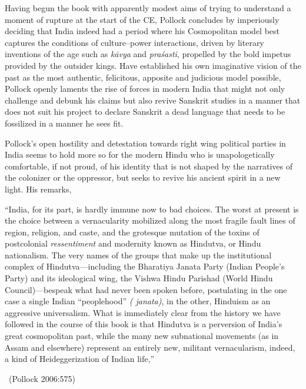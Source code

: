 Having begun the book with apparently modest aims of trying to understand a moment of rupture at the start of the CE, Pollock concludes by imperiously deciding that India indeed had a period where his Cosmopolitan model best captures the conditions of culture–power interactions, driven by literary inventions of the age such as \textit{kāvya} and \textit{praśasti}, propelled by the bold impetus provided by the outsider kings. Have established his own imaginative vision of the past as the most authentic, felicitous, apposite and judicious model possible, Pollock openly laments the rise of forces in modern India that might not only challenge and debunk his claims but also revive Sanskrit studies in a manner that does not suit his project to declare Sanskrit a dead language that needs to be fossilized in a manner he sees fit.

Pollock’s open hostility and detestation towards right wing political parties in India seems to hold more so for the modern Hindu who is unapologetically comfortable, if not proud, of his identity that is not shaped by the narratives of the colonizer or the oppressor, but seeks to revive his ancient spirit in a new light. His remarks,

\begin{myquote}
“India, for its part, is hardly immune now to bad choices. The worst at present is the choice between a vernacularity mobilized along the most fragile fault lines of region, religion, and caste, and the grotesque mutation of the toxins of postcolonial \textit{ressentiment} and modernity known as Hindutva, or Hindu nationalism. The very names of the groups that make up the institutional complex of Hindutva—including the Bharatiya Janata Party (Indian People’s Party) and its ideological wing, the Vishwa Hindu Parishad (World Hindu Council)—bespeak what had never been spoken before, postulating in the one case a single Indian “peoplehood” \textit{( janata)}, in the other, Hinduism as an aggressive universalism. What is immediately clear from the history we have followed in the course of this book is that Hindutva is a perversion of India’s great cosmopolitan past, while the many new subnational movements (as in Assam and elsewhere) represent an entirely new, militant vernacularism, indeed, a kind of Heideggerization of Indian life,” 

~\hfill (Pollock 2006:575)
\end{myquote}

